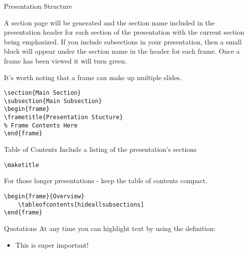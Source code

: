 \documentclass[newPxFont]{beamer}
\begin{document}
\begin{frame}[containsverbatim]{Presentation Structure}

A section page will be generated and the section name included in the presentation header for each section of the presentation with the current section being emphasized.  If you include subsections in your presentation, then a small block will appear under the section name in the header for each frame.  Once a frame has been viewed it will turn green.

It's worth noting that a frame can make up multiple slides.

\begin{verbatim}
\section{Main Section}
\subsection{Main Subsection}
\begin{frame}
\frametitle{Presentation Stucture}
% Frame Contents Here
\end{frame}
\end{verbatim}
\end{frame}


\begin{frame}[containsverbatim]{Table of Contents}
Include a listing of the presentation's sections
\begin{verbatim}
\maketitle
\end{verbatim}
For those longer presentations - keep the table of contents compact.
\begin{verbatim}
\begin{frame}{Overview}
    \tableofcontents[hideallsubsections]
\end{frame}
\end{verbatim}
\end{frame}


\begin{frame}[containsverbatim]{Quotations}
At any time you can highlight text by using the definition:
\begin{itemize}
	\item \alert{This is super important!}
\end{itemize}

\end{frame}
\end{document}
